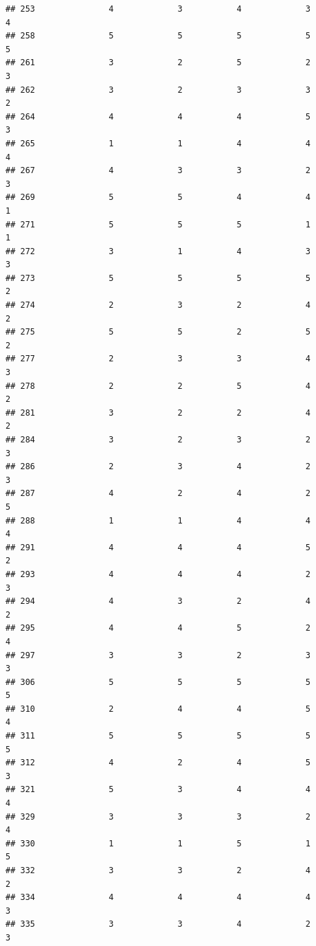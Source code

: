 \documentclass[
]{article}
\begin{document}
\begin{verbatim}
## 253               4             3           4             3            4
## 258               5             5           5             5            5
## 261               3             2           5             2            3
## 262               3             2           3             3            2
## 264               4             4           4             5            3
## 265               1             1           4             4            4
## 267               4             3           3             2            3
## 269               5             5           4             4            1
## 271               5             5           5             1            1
## 272               3             1           4             3            3
## 273               5             5           5             5            2
## 274               2             3           2             4            2
## 275               5             5           2             5            2
## 277               2             3           3             4            3
## 278               2             2           5             4            2
## 281               3             2           2             4            2
## 284               3             2           3             2            3
## 286               2             3           4             2            3
## 287               4             2           4             2            5
## 288               1             1           4             4            4
## 291               4             4           4             5            2
## 293               4             4           4             2            3
## 294               4             3           2             4            2
## 295               4             4           5             2            4
## 297               3             3           2             3            3
## 306               5             5           5             5            5
## 310               2             4           4             5            4
## 311               5             5           5             5            5
## 312               4             2           4             5            3
## 321               5             3           4             4            4
## 329               3             3           3             2            4
## 330               1             1           5             1            5
## 332               3             3           2             4            2
## 334               4             4           4             4            3
## 335               3             3           4             2            3

\end{verbatim}
\end{document}
